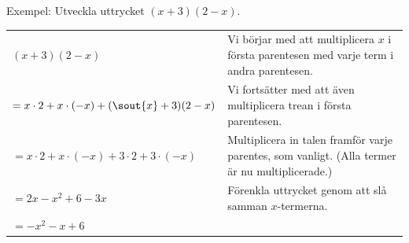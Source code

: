 Exempel: Utveckla uttrycket $(x+3)(2-x)$.

\smallskip
\begin{tabular}{l|p{5.7cm}}
  $(x+3)(2-x)$ & Vi börjar med att multiplicera $x$ i första parentesen med varje term i andra parentesen. \\
  $= x \cdot 2 + x \cdot (-x) + (\sout{x} + 3)(2-x)$ &  Vi fortsätter med att även multiplicera trean i första parentesen. \\
  $= x \cdot 2 + x \cdot (-x) + 3 \cdot 2 + 3 \cdot (-x)$ & Multiplicera in talen framför varje parentes, som vanligt. (Alla termer är nu multiplicerade.) \\
  $= 2x - x^2 + 6 - 3x$ & Förenkla uttrycket genom att slå samman $x$-termerna. \\
  $=-x^2 - x + 6$ & \\
\end{tabular}
\smallskip
